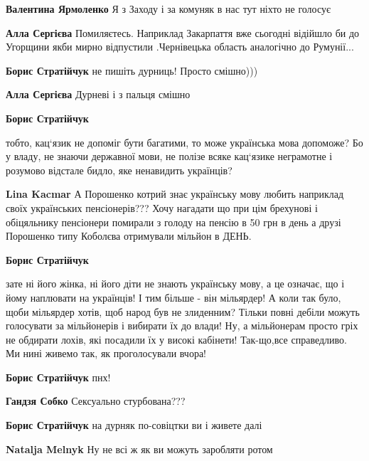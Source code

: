 \begin{itemize}
\begin{itemize}
\begin{itemize}
\textbf{Валентина Ярмоленко} Я з Заходу і за комуняк в нас тут ніхто не голосує

\textbf{Алла Сергієва} Помиляєтесь. Наприклад Закарпаття вже сьогодні відійшло би до Угорщини якби мирно відпустили .Чернівецька область аналогічно до Румунії...

\textbf{Борис Стратійчук} не пишіть дурниць! Просто смішно)))

\textbf{Алла Сергієва} Дурневі і з пальця смішно

\end{itemize} %

\textbf{Борис Стратійчук} 

тобто, кац‘язик не допоміг бути багатими, то може українська мова допоможе? Бо
у владу, не знаючи державної мови, не полізе всяке кац‘язике неграмотне і
розумово відстале бидло, яке ненавидить українців?

\begin{itemize} %
\textbf{Lina Kacmar} А Порошенко котрий знає українську мову любить наприклад своїх українських пенсіонерів??? Хочу нагадати що при цім брехунові і обіцяльнику пенсіонери помирали з голоду на пенсію в 50 грн в день а друзі Порошенко типу Коболєва отримували мільйон в ДЕНЬ.
\end{itemize} %

\textbf{Борис Стратійчук} 

зате ні його жінка, ні його діти не знають українську мову, а це означає, що і
йому наплювати на українців! І тим більше - він мільярдер! А коли так було,
щоби мільярдер хотів, щоб народ був не злиденним? Тільки повні дебіли можуть
голосувати за мільйонерів і вибирати їх до влади! Ну, а мільйонерам просто гріх
не обдирати лохів, які посадили їх у високі кабінети! Так-що,все справедливо.
Ми нині живемо так, як проголосували вчора!

\textbf{Борис Стратійчук} пнх!

\begin{itemize} %
\textbf{Гандзя Собко} Сексуально стурбована???
\end{itemize} %

\textbf{Борис Стратійчук} на дурняк по-совіцтки ви і живете далі

\begin{itemize} %
\textbf{Natalja Melnyk} Ну не всі ж як ви можуть заробляти ротом
\end{itemize} %


\end{itemize}
\end{itemize}

